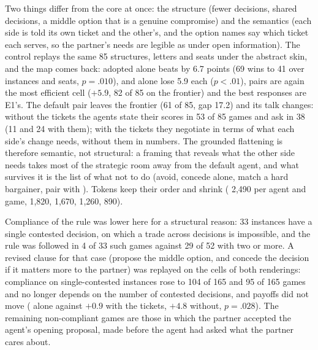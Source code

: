 Two things differ from the core at once: the structure (fewer decisions, shared decisions, a middle option that is a genuine compromise) and the semantics (each side is told its own ticket and the other's, and the option names say which ticket each serves, so the partner's needs are legible as under open information). The control replays the same 85 structures, letters and seats under the abstract skin, and the map comes back: \collaborating{} adopted alone beats \neutral{} by 6.7 points (69 wins to 41 over instances and seats, $p = .010$), \compromising{} and \accommodating{} alone lose 5.9 each ($p < .01$), \accommodating{} pairs are again the most efficient cell ($+5.9$, 82 of 85 on the frontier) and the best responses are E1's. The default pair leaves the frontier (61 of 85, gap 17.2) and its talk changes: without the tickets the \neutral{} agents state their scores in 53 of 85 games and ask in 38 (11 and 24 with them); with the tickets they negotiate in terms of what each side's change needs, without them in numbers. The grounded flattening is therefore semantic, not structural: a framing that reveals what the other side needs takes most of the strategic room away from the default agent, and what survives it is the list of what not to do (avoid, concede alone, match a hard bargainer, pair \competing{} with \competing). Tokens keep their order and shrink (\competing{} 2{,}490 per agent and game, \collaborating{} 1{,}820, \neutral{} 1{,}670, \accommodating{} 1{,}260, \avoiding{} 890).

Compliance of the \collaborating{} rule was lower here for a structural reason: 33 instances have a single contested decision, on which a trade across decisions is impossible, and the rule was followed in 4 of 33 such games against 29 of 52 with two or more. A revised clause for that case (propose the middle option, and concede the decision if it matters more to the partner) was replayed on the \collaborating{} cells of both renderings: compliance on single-contested instances rose to 104 of 165 and 95 of 165 games and no longer depends on the number of contested decisions, and payoffs did not move (\collaborating{} alone against \neutral{} $+0.9$ with the tickets, $+4.8$ without, $p = .028$). The remaining non-compliant games are those in which the partner accepted the agent's opening proposal, made before the agent had asked what the partner cares about. 

